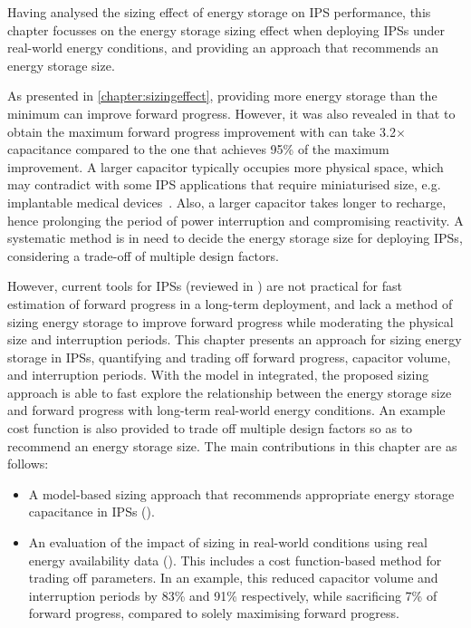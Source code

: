 Having analysed the sizing effect of energy storage on IPS performance, this chapter focusses on the energy storage sizing effect when deploying IPSs under real-world energy conditions, and providing an approach that recommends an energy storage size. 

As presented in \cref{chapter:sizingeffect}, providing more energy storage than the minimum can improve forward progress.
However, it was also revealed in  that to obtain the maximum forward progress improvement with  can take 3.2$\times$ capacitance compared to the one that achieves 95\% of the maximum improvement. 
A larger capacitor typically occupies more physical space, which may contradict with some IPS applications that require miniaturised size, e.g. implantable medical devices~\cite{amar2015power}.
Also, a larger capacitor takes longer to recharge, hence prolonging the period of power interruption and compromising reactivity. 
A systematic method is in need to decide the energy storage size for deploying IPSs, considering a trade-off of multiple design factors. 

However, current tools for IPSs (reviewed in ) are not practical for fast estimation of forward progress in a long-term deployment, and lack a method of sizing energy storage to improve forward progress while moderating the physical size and interruption periods. 
This chapter presents an approach for sizing energy storage in IPSs, quantifying and trading off forward progress, capacitor volume, and interruption periods. 
With the model in  integrated, the proposed sizing approach is able to fast explore the relationship between the energy storage size and forward progress with long-term real-world energy conditions. 
An example cost function is also provided to trade off multiple design factors so as to recommend an energy storage size. 
The main contributions in this chapter are as follows:
\begin{itemize}
    \item A model-based sizing approach that recommends appropriate energy storage capacitance in IPSs ().
    \item An evaluation of the impact of sizing in real-world conditions using real energy availability data (). 
    This includes a cost function-based method for trading off parameters. 
    In an example, this reduced capacitor volume and interruption periods by 83\% and 91\% respectively, while sacrificing 7\% of forward progress, compared to solely maximising forward progress.
\end{itemize}

